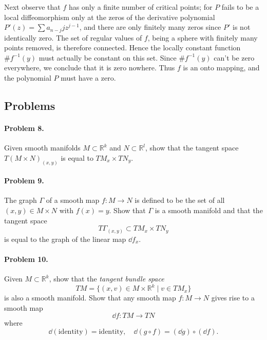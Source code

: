 Next observe that $f$ has only a finite number of critical points; for $P$ fails to be a local diffeomorphism only at the zeros of the derivative polynomial $P'(z) = \sum a_{n-j} j z^{j-1}$, and there are only finitely many zeros since $P'$ is not identically zero. The set of regular values of $f$, being a sphere with finitely many points removed, is therefore connected. Hence the locally constant function $\# f^{-1}(y)$ must actually be constant on this set. Since $\# f^{-1}(y)$ can't be zero everywhere, we conclude that it is zero nowhere. Thus $f$ is an onto mapping, and the polynomial $P$ must have a zero.

\subsection*{Problems}

\paragraph{Problem 8.}
Given smooth manifolds $M \subset \mathbb{R}^k$ and $N \subset \mathbb{R}^l$, show that the tangent space $T(M \times N)_{(x,y)}$ is equal to $TM_x \times TN_y$.

\paragraph{Problem 9.}
The graph $\Gamma$ of a smooth map $f : M \to N$ is defined to be the set of all $(x, y) \in M \times N$ with $f(x) = y$. Show that $\Gamma$ is a smooth manifold and that the tangent space
\[
T\Gamma_{(x,y)} \subset TM_x \times TN_y
\]
is equal to the graph of the linear map $\dd f_x$.

\paragraph{Problem 10.}
Given $M \subset \mathbb{R}^k$, show that the \emph{tangent bundle space}
\[
TM = \{(x, v) \in M \times \mathbb{R}^k \mid v \in TM_x\}
\]
is also a smooth manifold. Show that any smooth map $f : M \to N$ gives rise to a smooth map
\[
\dd f : TM \to TN
\]
where
\[
\dd(\text{identity}) = \text{identity}, \quad \dd(g \circ f) = (\dd g) \circ (\dd f).
\]


